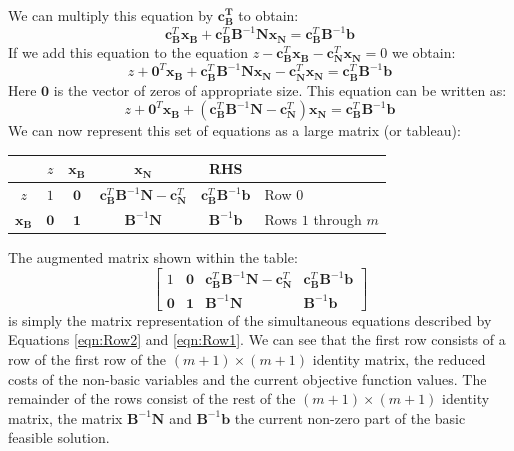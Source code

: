 We can multiply this equation by $\mathbf{c_B^T}$ to obtain:
\begin{equation}
\mathbf{c}_\mathbf{B}^T\mathbf{x_B} + \mathbf{c}_\mathbf{B}^T\mathbf{B}^{-1}\mathbf{N}\mathbf{x_N} = \mathbf{c}_\mathbf{B}^T\mathbf{B}^{-1}\mathbf{b}
\end{equation}
If we add this equation to the equation $z - \mathbf{c}_\mathbf{B}^T\mathbf{x_B} - \mathbf{c}_\mathbf{N}^T\mathbf{x_N} = 0$ we obtain:
\begin{equation}
z + \mathbf{0}^T\mathbf{x_B} + \mathbf{c}_\mathbf{B}^T\mathbf{B}^{-1}\mathbf{N}\mathbf{x_N} - \mathbf{c}_\mathbf{N}^T\mathbf{x_N} = \mathbf{c}_\mathbf{B}^T\mathbf{B}^{-1}\mathbf{b}
\end{equation}
Here $\mathbf{0}$ is the vector of zeros of appropriate size. This equation can be written as:
\begin{equation}
z + \mathbf{0}^T\mathbf{x_B} + \left(\mathbf{c}_\mathbf{B}^T\mathbf{B}^{-1}\mathbf{N} - \mathbf{c}_\mathbf{N}^T\right)\mathbf{x_N} = \mathbf{c}_\mathbf{B}^T\mathbf{B}^{-1}\mathbf{b}
\label{eqn:Row1}
\end{equation}
We can now represent this set of equations as a large matrix (or tableau):
\begin{center}
\begin{tabular}{|c|c|c|c|c|l|}
\hline
& $z$ & $\mathbf{x_B}$ & $\mathbf{x_N}$ & RHS & \\
\hline
$z$ & $1$ & $\mathbf{0}$ & $\mathbf{c}_\mathbf{B}^T\mathbf{B}^{-1}\mathbf{N} - \mathbf{c}_\mathbf{N}^T$ & $\mathbf{c}_\mathbf{B}^T\mathbf{B}^{-1}\mathbf{b}$ & Row 0\\
\hline
$\mathbf{x_B}$ & $\mathbf{0}$ & $\mathbf{1}$ & $\mathbf{B}^{-1}\mathbf{N}$ & $\mathbf{B}^{-1}\mathbf{b}$ & Rows $1$ through $m$\\
\hline
\end{tabular}
\end{center}
The augmented matrix shown within the table:
\begin{equation}
\left[
\begin{array}{ccc|c}
1 & \mathbf{0} & \mathbf{c}_\mathbf{B}^T\mathbf{B}^{-1}\mathbf{N} - \mathbf{c}_\mathbf{N}^T  & \mathbf{c}_\mathbf{B}^T\mathbf{B}^{-1}\mathbf{b}\\
\mathbf{0} & \mathbf{1} & \mathbf{B}^{-1}\mathbf{N} & \mathbf{B}^{-1}\mathbf{b}
\end{array}\right]
\end{equation}
is simply the matrix representation of the simultaneous equations described by Equations \ref{eqn:Row2} and \ref{eqn:Row1}. We can see that the first row consists of a row of the first row of the $(m+1) \times (m+1)$ identity matrix, the reduced costs of the non-basic variables and the current objective function values. The remainder of the rows consist of the rest of the $(m +1) \times (m+1)$ identity matrix, the matrix $\mathbf{B}^{-1}\mathbf{N}$ and $\mathbf{B}^{-1}\mathbf{b}$ the current non-zero part of the basic feasible solution. 

